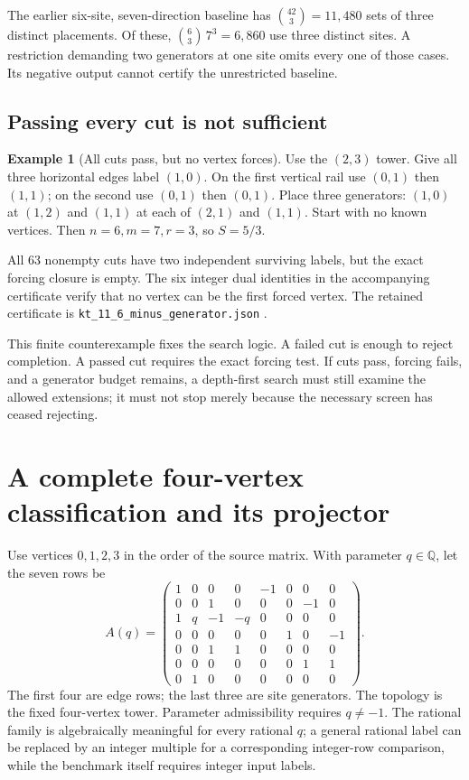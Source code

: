 \documentclass[11pt,letterpaper]{article}
\theoremstyle{definition}
\newtheorem{example}[theorem]{Example}
\theoremstyle{remark}\newtheorem{remark}[theorem]{Remark}
\newcommand{\Q}{\mathbb Q}\newcommand{\Z}{\mathbb Z}\newcommand{\R}{\mathbb R}
\begin{document}
The earlier six-site, seven-direction baseline has $\binom{42}{3}=11,480$ sets of three distinct placements. Of these, $\binom63\,7^3=6,860$ use three distinct sites. A restriction demanding two generators at one site omits every one of those cases. Its negative output cannot certify the unrestricted baseline.

\subsection{Passing every cut is not sufficient}
\begin{example}[All cuts pass, but no vertex forces]\label{ex:cutcounter}
Use the $(2,3)$ tower. Give all three horizontal edges label $(1,0)$. On the first vertical rail use $(0,1)$ then $(1,1)$; on the second use $(0,1)$ then $(0,1)$. Place three generators: $(1,0)$ at $(1,2)$ and $(1,1)$ at each of $(2,1)$ and $(1,1)$. Start with no known vertices. Then $n=6,m=7,r=3$, so $S=5/3$.

All $63$ nonempty cuts have two independent surviving labels, but the exact forcing closure is empty. The six integer dual identities in the accompanying certificate verify that no vertex can be the first forced vertex. The retained certificate is \texttt{kt\_11\_6\_minus\_generator.json} \cite{BeasleyFrontier}.
\end{example}
This finite counterexample fixes the search logic. A failed cut is enough to reject completion. A passed cut requires the exact forcing test. If cuts pass, forcing fails, and a generator budget remains, a depth-first search must still examine the allowed extensions; it must not stop merely because the necessary screen has ceased rejecting.

\section{A complete four-vertex classification and its projector}\label{sec:family}
Use vertices $0,1,2,3$ in the order of the source matrix. With parameter $q\in\Q$, let the seven rows be
\begin{equation}\label{eq:rows}
A(q)=\begin{pmatrix}
1&0&0&0&-1&0&0&0\\
0&0&1&0&0&0&-1&0\\
1&q&-1&-q&0&0&0&0\\
0&0&0&0&0&1&0&-1\\
0&0&1&1&0&0&0&0\\
0&0&0&0&0&0&1&1\\
0&1&0&0&0&0&0&0
\end{pmatrix}.
\end{equation}
The first four are edge rows; the last three are site generators. The topology is the fixed four-vertex tower. Parameter admissibility requires $q\ne-1$. The rational family is algebraically meaningful for every rational $q$; a general rational label can be replaced by an integer multiple for a corresponding integer-row comparison, while the benchmark itself requires integer input labels.
\end{document}
